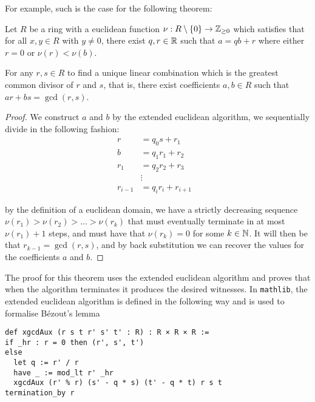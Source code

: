 For example, such is the case for the following theorem:

\begin{example}
    Let $R$ be a ring with a euclidean function $\nu : R \setminus \{0\} \rightarrow \mathbb{Z}_{\geq 0}$ which satisfies that for all $x, y \in R$ with $y \ne 0$, there exist $q, r \in \mathbb{R}$ such that $a  = qb + r$ where either $r = 0$ or $\nu(r) < \nu(b)$.

    For any $r,s \in R$ to find a unique linear combination which is the greatest common divisor of $r$ and $s$, that is, there exist coefficients $a, b \in R$ such that $ar + bs = \gcd(r, s)$.
\end{example}
\begin{proof}
    We construct $a$ and $b$ by the extended euclidean algorithm, we sequentially divide in the following fashion:
      \begin{align}
          r &= q_0 s + r_1\\
          b &= q_1 r_1 + r_2\\
          r_1 &= q_2 r_2 + r_3\\
          &\vdots\\
          r_{i-1} &= q_i r_i + r_{i + 1}&
      \end{align}
  
      by the definition of a euclidean domain, we have a strictly decreasing sequence $\nu(r_1) > \nu(r_2) > \ldots > \nu(r_k)$ that must eventually terminate in at most $\nu(r_1) + 1$ steps,
      and must have that $\nu(r_k) = 0$ for some $k \in \mathbb{N}$. It will then be that $r_{k -1} = \gcd(r, s)$, and by back substitution we can recover the values for the coefficients $a$ and $b$.
  \end{proof}

The proof for this theorem uses the extended euclidean algorithm and proves that when the algorithm terminates it produces the desired witnesses.
In \texttt{mathlib}, the extended euclidean algorithm is defined in the following way and is used to formalise Bézout's lemma

\begin{footnotesize}
\begin{verbatim}
def xgcdAux (r s t r' s' t' : R) : R × R × R :=
if _hr : r = 0 then (r', s', t')
else
  let q := r' / r
  have _ := mod_lt r' _hr
  xgcdAux (r' % r) (s' - q * s) (t' - q * t) r s t
termination_by r
\end{verbatim}
\end{footnotesize}


